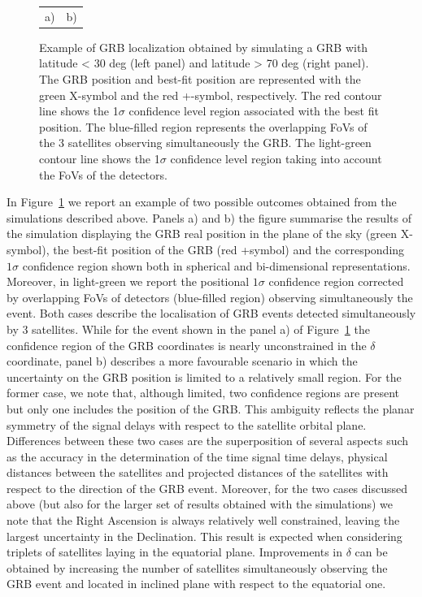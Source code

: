 \documentclass[]{spie}  %
\begin{document}
\begin{figure}
\begin{center}
\begin{tabular}{cc}
a) & b)\\
\end{tabular}
\end{center}
\vspace{-3.5cm}
\caption[example] 
{ \label{fig:conf_reg} 
Example of GRB localization obtained by simulating a GRB with latitude < 30 deg (left panel) and latitude > 70 deg (right panel). The GRB position and best-fit position are represented with the green X-symbol and the red +-symbol, respectively.  The red contour line shows the 1$\sigma$ confidence level region associated with the best fit position. The blue-filled region represents the overlapping FoVs of the 3 satellites observing simultaneously the GRB. The light-green contour line shows the 1$\sigma$ confidence level region taking into account the FoVs of the detectors.}
\end{figure}



In Figure~\ref{fig:conf_reg} we report an example of two possible outcomes obtained from the simulations described above. Panels a) and b) the figure summarise the results of the simulation displaying the GRB real position in the plane of the sky (green X-symbol), the best-fit position of the GRB (red +symbol) and the corresponding $1\sigma$ confidence region shown both in spherical and bi-dimensional representations. Moreover, in light-green we report the positional $1\sigma$ confidence region corrected by overlapping FoVs of detectors (blue-filled region) observing simultaneously the event. Both cases describe the localisation of GRB events detected simultaneously by 3 satellites. While for the event shown in the panel a) of Figure~\ref{fig:conf_reg} the confidence region of the GRB coordinates is nearly unconstrained in the $\delta$ coordinate, panel b) describes a more favourable scenario in which the uncertainty on the GRB position is limited to a relatively small region. For the former case, we note that, although limited, two confidence regions are present but only one includes the position of the GRB. This ambiguity reflects the planar symmetry of the signal delays with respect to the satellite orbital plane. Differences between these two cases are the superposition of several aspects such as the accuracy in the determination of the time signal time delays, physical distances between the satellites and projected distances of the satellites with respect to the direction of the GRB event. Moreover, for the two cases discussed above (but also for the larger set of results obtained with the simulations) we note that the Right Ascension is always relatively well constrained, leaving the largest uncertainty in the Declination. This result is expected when considering triplets of satellites laying in the equatorial plane. Improvements in $\delta$ can be obtained by increasing the number of satellites simultaneously observing the GRB event and located in inclined plane with respect to the equatorial one.
\end{document}
